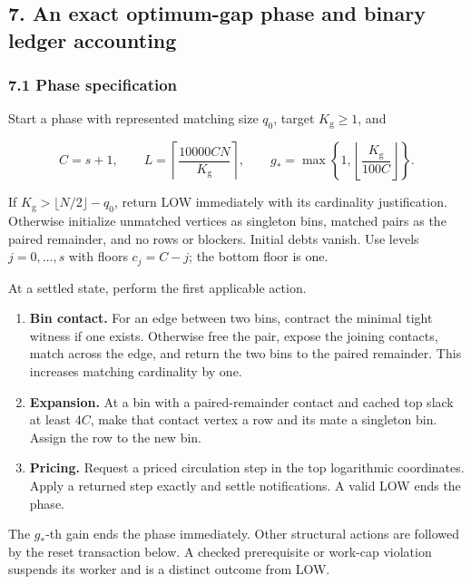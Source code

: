 \hypertarget{af-46593eb93e-an-exact-optimum-gap-phase-and-binary-ledger-accounting}{%
\subsection{7. An exact optimum-gap phase and binary ledger accounting}\label{af-46593eb93e-an-exact-optimum-gap-phase-and-binary-ledger-accounting}}

\hypertarget{af-46593eb93e-phase-specification}{%
\subsubsection{7.1 Phase specification}\label{af-46593eb93e-phase-specification}}

Start a phase with represented matching size \(q_0\), target \(K_{\mathrm g}\geq1\), and

\[
C=s+1,\qquad
 L=\left\lceil\frac{10000CN}{K_{\mathrm g}}\right\rceil,\qquad
 g_*=\max\left\{1,\left\lfloor\frac{K_{\mathrm g}}{100C}\right\rfloor\right\}.
 \tag{10}
\]

If \(K_{\mathrm g}>\lfloor N/2\rfloor-q_0\), return LOW immediately with its cardinality justification. Otherwise initialize unmatched vertices as singleton bins, matched pairs as the paired remainder, and no rows or blockers. Initial debts vanish. Use levels \(j=0,\ldots,s\) with floors \(c_j=C-j\); the bottom floor is one.

At a settled state, perform the first applicable action.

\begin{enumerate}
\def\labelenumi{\arabic{enumi}.}
\tightlist
\item
  \textbf{Bin contact.} For an edge between two bins, contract the minimal tight witness if one exists. Otherwise free the pair, expose the joining contacts, match across the edge, and return the two bins to the paired remainder. This increases matching cardinality by one.
\item
  \textbf{Expansion.} At a bin with a paired-remainder contact and cached top slack at least \(4C\), make that contact vertex a row and its mate a singleton bin. Assign the row to the new bin.
\item
  \textbf{Pricing.} Request a priced circulation step in the top logarithmic coordinates. Apply a returned step exactly and settle notifications. A valid LOW ends the phase.
\end{enumerate}

The \(g_*\)-th gain ends the phase immediately. Other structural actions are followed by the reset transaction below. A checked prerequisite or work-cap violation suspends its worker and is a distinct outcome from LOW.

